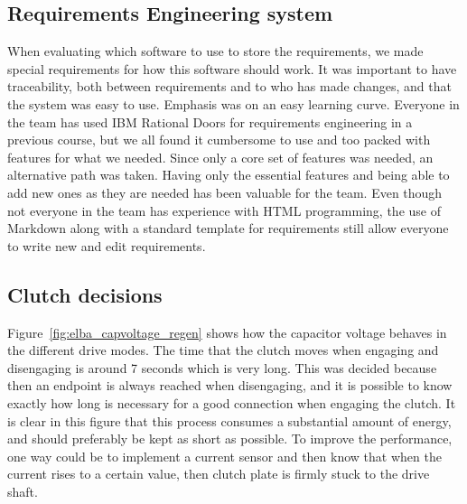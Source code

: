 \subsection{Requirements Engineering system}
When evaluating which software to use to store the requirements, we made
special requirements for how this software should work. It was important to have
traceability, both between requirements and to who has made changes, and that
the system was easy to use. Emphasis was on an easy learning curve. Everyone in
the team has used IBM Rational Doors for requirements engineering in a previous
course, but we all found it cumbersome to use and too packed with features for
what we needed. Since only a core set of features was needed, an alternative
path was taken. Having only the essential features and being able to add new
ones as they are needed has been valuable for the team. Even though not everyone
in the team has experience with HTML programming, the use of Markdown along with
a standard template for requirements still allow everyone to write new and edit
requirements. 

\subsection{Clutch decisions}
Figure~\ref{fig:elba_capvoltage_regen} shows how the capacitor voltage behaves in the different drive modes.
The time that the clutch moves when engaging and disengaging is around 7 seconds which is very long. This was decided because then an endpoint is always reached when disengaging, and it is possible to know exactly how long is necessary 
for a good connection when engaging the clutch. It is clear in this figure that this process consumes a substantial 
amount of energy, and should preferably be kept as short as possible. To improve the performance, one way could be to implement a current sensor and then know that when the current rises to a certain value, then clutch plate is firmly stuck to the drive shaft.

